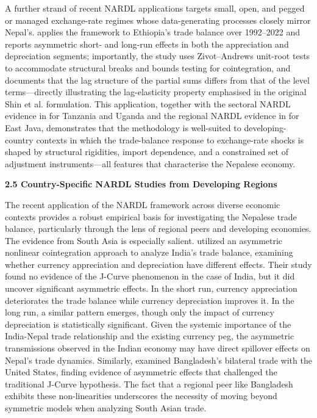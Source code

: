 \documentclass[12pt]{article}
\begin{document}
A further strand of recent NARDL applications targets small, open, and pegged or managed exchange-rate regimes whose data-generating processes closely mirror Nepal's. \textcite{Abegaz2024-wp} applies the framework to Ethiopia's trade balance over 1992--2022 and reports asymmetric short- and long-run effects in both the appreciation and depreciation segments; importantly, the study uses Zivot--Andrews unit-root tests to accommodate structural breaks and bounds testing for cointegration, and documents that the lag structure of the partial sums differs from that of the level terms---directly illustrating the lag-elasticity property emphasised in the original Shin et al. formulation. This application, together with the sectoral NARDL evidence in \textcite{Albiman2022-fo} for Tanzania and Uganda and the regional NARDL evidence in \textcite{Pertiwi2024-me} for East Java, demonstrates that the methodology is well-suited to developing-country contexts in which the trade-balance response to exchange-rate shocks is shaped by structural rigidities, import dependence, and a constrained set of adjustment instruments---all features that characterise the Nepalese economy.

\vspace{0.5cm}
\noindent\textbf{2.5 Country-Specific NARDL Studies from Developing Regions}

The recent application of the NARDL framework across diverse economic contexts provides a robust empirical basis for investigating the Nepalese trade balance, particularly through the lens of regional peers and developing economies. The evidence from South Asia is especially salient. \textcite{Bhat2021-ux} utilized an asymmetric nonlinear cointegration approach to analyze India's trade balance, examining whether currency appreciation and depreciation have different effects. Their study found no evidence of the J-Curve phenomenon in the case of India, but it did uncover significant asymmetric effects. In the short run, currency appreciation deteriorates the trade balance while currency depreciation improves it. In the long run, a similar pattern emerges, though only the impact of currency depreciation is statistically significant. Given the systemic importance of the India-Nepal trade relationship and the existing currency peg, the asymmetric transmissions observed in the Indian economy may have direct spillover effects on Nepal's trade dynamics. Similarly, \textcite{Dey2025} examined Bangladesh's bilateral trade with the United States, finding evidence of asymmetric effects that challenged the traditional J-Curve hypothesis. The fact that a regional peer like Bangladesh exhibits these non-linearities underscores the necessity of moving beyond symmetric models when analyzing South Asian trade.
\end{document}
